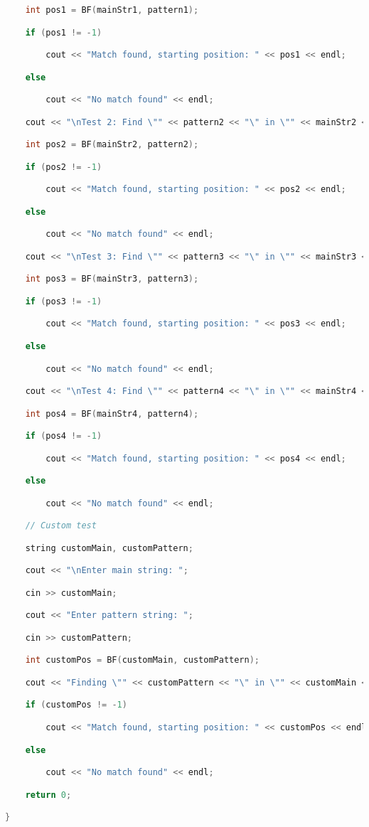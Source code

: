 \begin{lstlisting}[language=C++]
    int pos1 = BF(mainStr1, pattern1);

    if (pos1 != -1)

        cout << "Match found, starting position: " << pos1 << endl;

    else

        cout << "No match found" << endl;

    cout << "\nTest 2: Find \"" << pattern2 << "\" in \"" << mainStr2 << "\"" << endl;

    int pos2 = BF(mainStr2, pattern2);

    if (pos2 != -1)

        cout << "Match found, starting position: " << pos2 << endl;

    else

        cout << "No match found" << endl;

    cout << "\nTest 3: Find \"" << pattern3 << "\" in \"" << mainStr3 << "\"" << endl;

    int pos3 = BF(mainStr3, pattern3);

    if (pos3 != -1)

        cout << "Match found, starting position: " << pos3 << endl;

    else

        cout << "No match found" << endl;

    cout << "\nTest 4: Find \"" << pattern4 << "\" in \"" << mainStr4 << "\"" << endl;

    int pos4 = BF(mainStr4, pattern4);

    if (pos4 != -1)

        cout << "Match found, starting position: " << pos4 << endl;

    else

        cout << "No match found" << endl;

    // Custom test

    string customMain, customPattern;

    cout << "\nEnter main string: ";

    cin >> customMain;

    cout << "Enter pattern string: ";

    cin >> customPattern;

    int customPos = BF(customMain, customPattern);

    cout << "Finding \"" << customPattern << "\" in \"" << customMain << "\"" << endl;

    if (customPos != -1)

        cout << "Match found, starting position: " << customPos << endl;

    else

        cout << "No match found" << endl;

    return 0;

}
\end{lstlisting}
